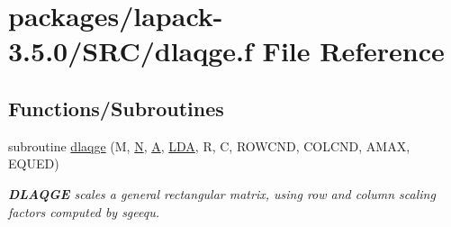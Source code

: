 \hypertarget{dlaqge_8f}{}\section{packages/lapack-\/3.5.0/\+S\+R\+C/dlaqge.f File Reference}
\label{dlaqge_8f}
\subsection*{Functions/\+Subroutines}
\begin{DoxyCompactItemize}
\item 
subroutine \hyperlink{group__doubleGEauxiliary_gaac3990ea4aa237d06ad9563df69abac3}{dlaqge} (M, \hyperlink{polmisc_8c_a0240ac851181b84ac374872dc5434ee4}{N}, \hyperlink{classA}{A}, \hyperlink{example__user_8c_ae946da542ce0db94dced19b2ecefd1aa}{L\+D\+A}, R, C, R\+O\+W\+C\+N\+D, C\+O\+L\+C\+N\+D, A\+M\+A\+X, E\+Q\+U\+E\+D)
\begin{DoxyCompactList}\small\item\em {\bfseries D\+L\+A\+Q\+G\+E} scales a general rectangular matrix, using row and column scaling factors computed by sgeequ. \end{DoxyCompactList}\end{DoxyCompactItemize}
